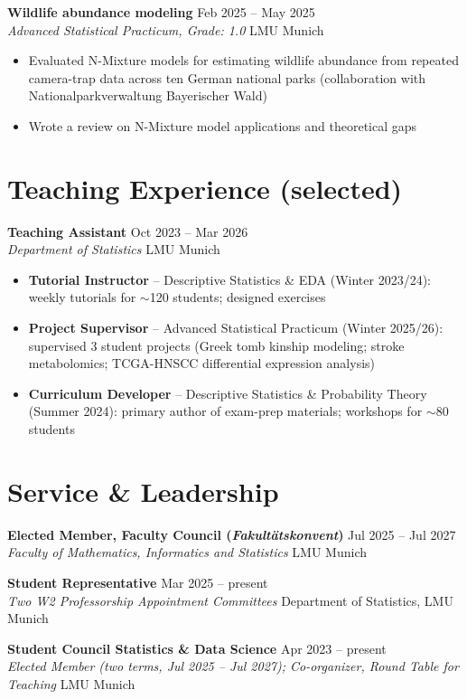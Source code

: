 \documentclass[a4paper,11pt]{article}
\newcommand{\entry}[4]{%
  \textbf{#1} \hfill #2\\
  \textit{#3} \hfill #4\par
}
\begin{document}
\entry{Wildlife abundance modeling}{Feb 2025 -- May 2025}
      {Advanced Statistical Practicum, Grade: 1.0}{LMU Munich}
\begin{itemize}[leftmargin=1.5em, itemsep=0pt, parsep=0.1em, topsep=0.1em]
\item Evaluated N-Mixture models for estimating wildlife abundance from repeated camera-trap data across ten German national parks (collaboration with Nationalparkverwaltung Bayerischer Wald)
\item Wrote a review on N-Mixture model applications and theoretical gaps
\end{itemize}

\section*{Teaching Experience (selected)}

\entry{Teaching Assistant}{Oct 2023 -- Mar 2026}
      {Department of Statistics}{LMU Munich}
\begin{itemize}[leftmargin=1.5em, itemsep=0pt, parsep=0.1em, topsep=0.1em]
\item \textbf{Tutorial Instructor} -- Descriptive Statistics \& EDA (Winter 2023/24): weekly tutorials for $\sim$120 students; designed exercises
\item \textbf{Project Supervisor} -- Advanced Statistical Practicum (Winter 2025/26): supervised 3 student projects (Greek tomb kinship modeling; stroke metabolomics; TCGA-HNSCC differential expression analysis)
\item \textbf{Curriculum Developer} -- Descriptive Statistics \& Probability Theory (Summer 2024): primary author of exam-prep materials; workshops for $\sim$80 students
\end{itemize}
\section*{Service \& Leadership}

\entry{Elected Member, Faculty Council (\textit{Fakultätskonvent})}{Jul 2025 -- Jul 2027}
      {Faculty of Mathematics, Informatics and Statistics}{LMU Munich}
\entry{Student Representative}{Mar 2025 -- present}
      {Two W2 Professorship Appointment Committees}{Department of Statistics, LMU Munich}
\entry{Student Council Statistics \& Data Science}{Apr 2023 -- present}
      {Elected Member (two terms, Jul 2025 -- Jul 2027); Co-organizer, Round Table for Teaching}{LMU Munich}
\end{document}
